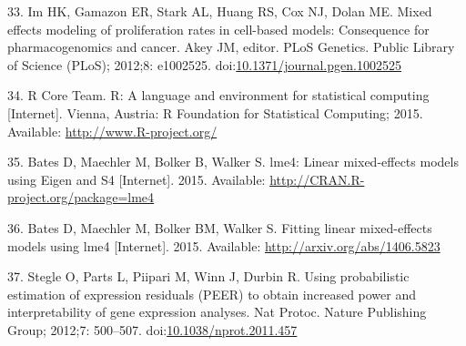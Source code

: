 \documentclass[]{article}
\begin{document}
33. Im HK, Gamazon ER, Stark AL, Huang RS, Cox NJ, Dolan ME. Mixed
effects modeling of proliferation rates in cell-based models:
Consequence for pharmacogenomics and cancer. Akey JM, editor. PLoS
Genetics. Public Library of Science (PLoS); 2012;8: e1002525.
doi:\href{http://dx.doi.org/10.1371/journal.pgen.1002525}{10.1371/journal.pgen.1002525}

34. R Core Team. R: A language and environment for statistical computing
{[}Internet{]}. Vienna, Austria: R Foundation for Statistical Computing;
2015. Available: \url{http://www.R-project.org/}

35. Bates D, Maechler M, Bolker B, Walker S. lme4: Linear mixed-effects
models using Eigen and S4 {[}Internet{]}. 2015. Available:
\url{http://CRAN.R-project.org/package=lme4}

36. Bates D, Maechler M, Bolker BM, Walker S. Fitting linear
mixed-effects models using lme4 {[}Internet{]}. 2015. Available:
\url{http://arxiv.org/abs/1406.5823}

37. Stegle O, Parts L, Piipari M, Winn J, Durbin R. Using probabilistic
estimation of expression residuals (PEER) to obtain increased power and
interpretability of gene expression analyses. Nat Protoc. Nature
Publishing Group; 2012;7: 500--507.
doi:\href{http://dx.doi.org/10.1038/nprot.2011.457}{10.1038/nprot.2011.457}
\end{document}
